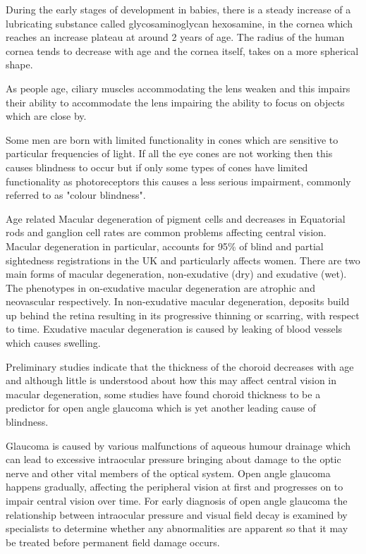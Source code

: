 During the early stages of development in babies, there is a steady
increase of a lubricating substance called glycosaminoglycan hexosamine,
in the cornea which reaches an increase plateau at around 2 years of age.
\cite{praus1975glycosaminoglycans} The radius of the human cornea tends
to decrease with age and the cornea itself, takes on a more spherical
shape.\cite{guirao2000optical}

As people age, ciliary muscles accommodating the lens weaken and
this impairs their ability to accommodate the lens impairing
the ability to focus on objects which are close by.
\cite{fisher1985ciliary}

Some men are born with limited functionality in cones which are
sensitive to particular frequencies of light.\cite{george1996clinical}
If all the eye cones are not working then this causes blindness
to occur but if only some types of cones have limited functionality
as photoreceptors this causes a less serious impairment, commonly
referred to as "colour blindness".

Age related Macular degeneration of pigment cells and decreases in
Equatorial rods and ganglion cell rates are common problems affecting
central vision.\cite{gao1992aging} Macular degeneration in particular,
accounts for 95\% of blind and partial sightedness registrations in the
UK and particularly affects women.\cite{o1998age,klein2005complement}
There are two main forms of macular degeneration, non-exudative (dry)
and exudative (wet). The phenotypes in on-exudative macular degeneration
are atrophic and neovascular respectively.\cite{kuno2011dry} In
non-exudative macular degeneration, deposits build up behind the retina
resulting in its progressive thinning or scarring, with respect to time.
Exudative macular degeneration is caused by leaking of blood vessels
which causes swelling.

Preliminary studies indicate that the thickness of the choroid decreases
with age and although little is understood about how this may affect
central vision in macular degeneration, some studies have found
choroid thickness to be a predictor for open angle glaucoma which
is yet another leading cause of blindness.
\cite{margolis2009pilot,gordon2002ocular}

Glaucoma is caused by various malfunctions of aqueous humour drainage
which can lead to excessive intraocular pressure bringing about damage
to the optic nerve and other vital members of the optical system.
\cite{distelhorst2003open} Open angle glaucoma happens gradually,
affecting the peripheral vision at first and progresses on to impair
central vision over time. For early diagnosis of open angle glaucoma
the relationship between intraocular pressure and visual field decay
is examined by specialists to determine whether any abnormalities are
apparent so that it may be treated before permanent field damage occurs.
\cite{goldmann1972open}

